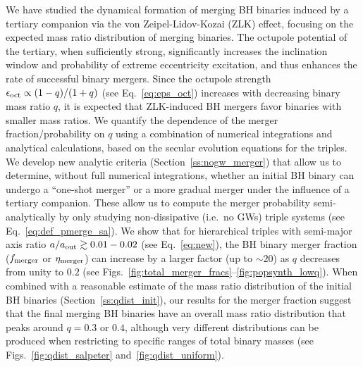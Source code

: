 \documentclass[
        fleqn,
        usenatbib,
    ]{mnras}
\begin{document}
We have studied the dynamical formation of merging BH binaries induced by a
tertiary companion via the von Zeipel-Lidov-Kozai (ZLK) effect, focusing on the
expected mass ratio distribution of merging binaries. The octupole potential of
the tertiary, when sufficiently strong, significantly increases the inclination
window and probability of extreme eccentricity excitation, and thus enhances the
rate of successful binary mergers. Since the octupole strength $\epsilon_{\rm
oct} \propto (1-q)/(1+q)$ (see Eq.~\ref{eq:eps_oct}) increases with decreasing
binary mass ratio $q$, it is expected that ZLK-induced BH mergers favor binaries
with smaller mass ratios. We quantify the dependence of the merger
fraction/probability on $q$ using a combination of numerical integrations and
analytical calculations, based on the secular evolution equations for the
triples. We develop new analytic criteria (Section~\ref{ss:nogw_merger}) that
allow us to determine, without full numerical integrations, whether an initial
BH binary can undergo a ``one-shot merger'' or a more gradual merger under the
influence of a tertiary companion. These allow us to compute the merger
probability semi-analytically by only studying non-dissipative (i.e.\ no GWs)
triple systems (see Eq.~\ref{eq:def_pmerge_sa}). We show that for hierarchical
triples with semi-major axis ratio $a/a_{\rm out}\gtrsim 0.01-0.02$ (see
Eq.~\ref{eq:new}), the BH binary merger fraction ($f_{\rm merger}$ or $\eta_{\rm
merger}$) can increase by a larger factor (up to $\sim 20$) as $q$ decreases
from unity to $0.2$ (see
Figs.~\ref{fig:total_merger_fracs}--\ref{fig:popsynth_lowq}). When combined with
a reasonable estimate of the mass ratio distribution of the initial BH binaries
(Section~\ref{ss:qdist_init}), our results for the merger fraction suggest that
the final merging BH binaries have an overall mass ratio distribution that peaks
around $q = 0.3$ or $0.4$, although very different distributions can be produced
when restricting to specific ranges of total binary masses (see
Figs.~\ref{fig:qdist_salpeter} and~\ref{fig:qdist_uniform}).
\end{document}
